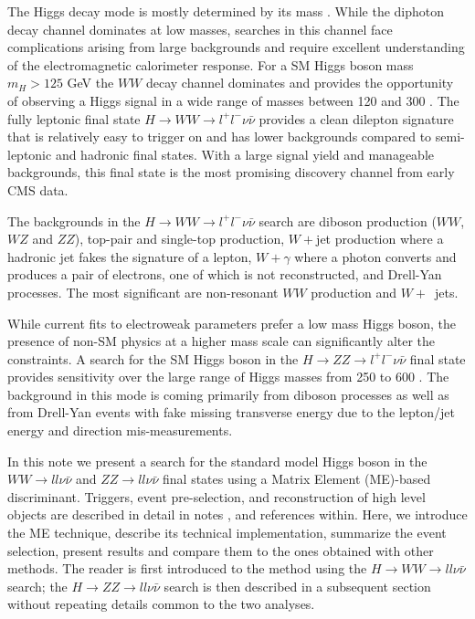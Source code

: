 The Higgs decay mode is mostly determined by its mass \cite{ref:Hdecay}. While the diphoton decay channel dominates at low masses, searches 
in this channel face complications arising from large backgrounds and require excellent understanding of the electromagnetic
calorimeter response. For a SM Higgs boson mass $m_{H}>125$ GeV the $WW$ decay channel dominates and provides the opportunity of observing a 
Higgs signal in a wide range of masses between 120 and 300 \GeVcc.  The fully leptonic final state $H \rightarrow WW 
\rightarrow l^{+}l^{-}\nu\bar{\nu}$ provides a clean dilepton signature that is relatively easy to trigger on and has lower backgrounds compared to
semi-leptonic and hadronic final states. With a large signal yield and manageable backgrounds, 
this final state is the most promising discovery channel from early CMS data. 

The backgrounds in the $H \rightarrow WW \rightarrow l^{+}l^{-}\nu\bar{\nu}$ search are diboson production ($WW$, $WZ$ and $ZZ$), top-pair and 
single-top production, $W+$jet production where a hadronic jet fakes the signature of a lepton, $W+\gamma$ where a photon 
converts  and produces a pair of electrons, one of which is not reconstructed, and Drell-Yan processes.  The most significant are
non-resonant $WW$ production and $W+$~jets.

While current fits to electroweak parameters prefer a low mass Higgs boson, the presence of non-SM physics at a higher mass scale can significantly alter
 the constraints. A search for the SM Higgs boson in the $H \rightarrow ZZ \rightarrow l^{+}l^{-}\nu\bar{\nu}$ final state provides sensitivity over the large
range of Higgs masses from 250 to 600 \GeVcc. The background in this mode is coming primarily from diboson processes as well as from Drell-Yan events with fake missing transverse energy due to the lepton/jet energy and direction mis-measurements. 

In this note we present a search for the standard model Higgs boson in the $WW \rightarrow ll\nu\bar{\nu}$ and $ZZ \rightarrow ll\nu\bar{\nu}$ final states 
using a Matrix Element (ME)-based discriminant. Triggers, event pre-selection, and reconstruction of high level objects are described 
in detail in notes \cite{ref:HWW2011smurf}, \cite{ref:HZZ2011smurf} and references within. Here, we introduce the ME technique, 
describe its technical implementation, summarize the event selection, present results and compare them to the ones obtained with 
other methods. The reader is first introduced to the method using the $H\rightarrow WW \rightarrow ll\nu\bar{\nu}$ search; the
$H \rightarrow ZZ \rightarrow ll\nu\bar{\nu}$ search is then described in a subsequent section without repeating details common to the two analyses.
